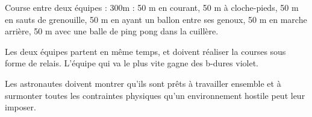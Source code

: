 \documentclass{grand-jeu}
\begin{document}
\begin{liste-materiel}

\end{liste-materiel}

\begin{regles}

Course entre deux équipes : 
300m : 50 m en courant, 50 m à cloche-pieds, 50 m en sauts de grenouille, 50 m en ayant un ballon entre ses genoux, 50 m en marche arrière, 50 m avec une balle de ping pong dans la cuillère.

Les deux équipes partent en même temps, et doivent réaliser la courses sous forme de relais. L’équipe qui va le plus vite gagne des b-dures violet. 
\end{regles}

\begin{imaginaire}
Les astronautes doivent montrer qu'ils sont prêts à travailler ensemble et à surmonter toutes les contraintes physiques qu'un environnement hostile peut leur imposer.
\end{imaginaire}

\begin{moments-stop}
\end{moments-stop}
\end{document}
